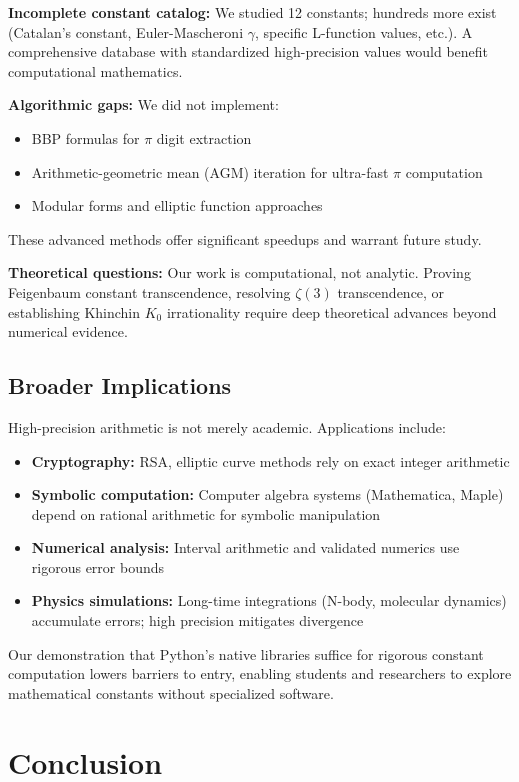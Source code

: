 \documentclass[11pt,a4paper]{article}
\begin{document}
\textbf{Incomplete constant catalog:} We studied 12 constants; hundreds more exist (Catalan's constant, Euler-Mascheroni $\gamma$, specific L-function values, etc.). A comprehensive database with standardized high-precision values would benefit computational mathematics.

\textbf{Algorithmic gaps:} We did not implement:
\begin{itemize}
    \item BBP formulas for $\pi$ digit extraction \citep{cloitre2025bbp}
    \item Arithmetic-geometric mean (AGM) iteration for ultra-fast $\pi$ computation
    \item Modular forms and elliptic function approaches
\end{itemize}
These advanced methods offer significant speedups and warrant future study.

\textbf{Theoretical questions:} Our work is computational, not analytic. Proving Feigenbaum constant transcendence, resolving $\zeta(3)$ transcendence, or establishing Khinchin $K_0$ irrationality require deep theoretical advances beyond numerical evidence.

\subsection{Broader Implications}

High-precision arithmetic is not merely academic. Applications include:
\begin{itemize}
    \item \textbf{Cryptography:} RSA, elliptic curve methods rely on exact integer arithmetic
    \item \textbf{Symbolic computation:} Computer algebra systems (Mathematica, Maple) depend on rational arithmetic for symbolic manipulation
    \item \textbf{Numerical analysis:} Interval arithmetic and validated numerics use rigorous error bounds
    \item \textbf{Physics simulations:} Long-time integrations (N-body, molecular dynamics) accumulate errors; high precision mitigates divergence
\end{itemize}

Our demonstration that Python's native libraries suffice for rigorous constant computation lowers barriers to entry, enabling students and researchers to explore mathematical constants without specialized software.

\section{Conclusion}
\end{document}

